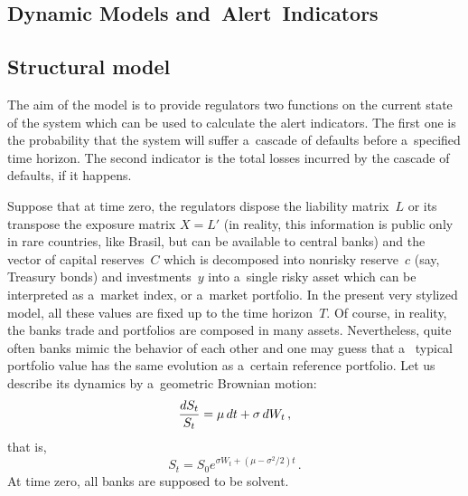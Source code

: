 \begin{multicols}{2}

 

\section{Dynamic Models and~Alert~Indicators}

\subsection {Structural model}

\noindent
The aim of the model is to provide regulators two functions on the current state 
of the system 
which can be used to calculate the alert indicators. 
The first one is the probability that the system will suffer  a~cascade of 
defaults before a~specified 
time horizon. The second  indicator 
is the total losses  incurred by the cascade of defaults, if it happens. 
 
Suppose that at time zero, the regulators dispose the liability matrix~$L$ or 
its transpose the exposure matrix $X=L'$ (in reality, this  information is  
public only in rare countries, like Brasil, but can be available to central 
banks) and the vector of capital reserves~$C$ which 
is decomposed into nonrisky reserve~$c$ (say, Treasury bonds) and investments~$y$ 
into a~single risky asset which can be  interpreted as a~market index, or 
a~market portfolio.   In the present very stylized model,  all these values are fixed up to 
the time horizon~$T$.  
Of course, in reality, the banks trade and portfolios are composed in many 
assets.
Nevertheless,  quite often banks mimic the behavior of each other and one may 
guess  that a~ typical portfolio value has the same evolution as a~certain 
reference 
portfolio. Let us describe its dynamics by a~geometric Brownian motion:
\begin{equation}
\displaystyle\frac{\displaystyle dS_t\mathstrut}{\displaystyle S_t\mathstrut}=\mu\, dt + \sigma\, dW_t\,, 
\label{e3a-kab}
\end{equation}
that is,  
$$
S_t=S_0e^{\sigma W_t+(\mu -\sigma^2/2)t}\,. 
$$
At time zero, all banks are supposed to be  solvent.  


\end{multicols}
